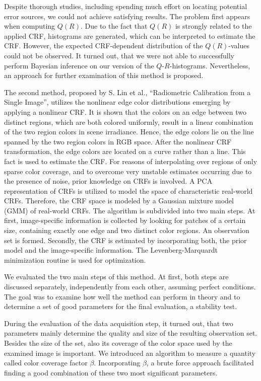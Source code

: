 Despite thorough studies, including spending much effort on locating potential error sources, we could not achieve satisfying results. The problem first appears when computing $Q(R)$. Due to the fact that $Q(R)$ is strongly related to the applied CRF, histograms are generated, which can be interpreted to estimate the CRF. However, the expected CRF-dependent distribution of the $Q(R)$-values could not be observed. It turned out, that we were not able to successfully perform Bayesian inference on our version of the $Q$-$R$-histograms. Nevertheless, an approach for further examination of this method is proposed.

The second method, proposed by S. Lin et \hbox{al.}, ``Radiometric Calibration from a Single Image'', utilizes the nonlinear edge color distributions emerging by applying a nonlinear CRF. It is shown that the colors on an edge between two distinct regions, which are both colored uniformly, result in a linear combination of the two region colors in scene irradiance. Hence, the edge colors lie on the line spanned by the two region colors in RGB space. After the nonlinear CRF transformation, the edge colors are located on a curve rather than a line. This fact is used to estimate the CRF. For reasons of interpolating over regions of only sparse color coverage, and to overcome very unstable estimates occurring due to the presence of noise, prior knowledge on CRFs is involved. A PCA representation of CRFs is utilized to model the space of characteristic real-world CRFs. Therefore, the CRF space is modeled by a Gaussian mixture model (GMM) of real-world CRFs. The algorithm is subdivided into two main steps. At first, image-specific information is collected by looking for patches of a certain size, containing exactly one edge and two distinct color regions. An observation set is formed. Secondly, the CRF is estimated by incorporating both, the prior model and the image-specific information. The Levenberg-Marquardt minimization routine is used for optimization.

We evaluated the two main steps of this method. At first, both steps are discussed separately, independently from each other, assuming perfect conditions. The goal was to examine how well the method can perform in theory and to determine a set of good parameters for the final evaluation, a stability test.

During the evaluation of the data acquisition step, it turned out, that two parameters mainly determine the quality and size of the resulting observation set. Besides the size of the set, also its coverage of the color space used by the examined image is important. We introduced an algorithm to measure a quantity called color coverage factor $\beta$. Incorporating $\beta$, a brute force approach facilitated finding a good combination of these two most significant parameters.

